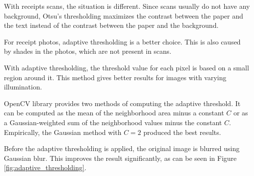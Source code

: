 \documentclass[
  digital, %
  table,   %
  oneside, %
  lof,     %
  lot,     %
]{fithesis3}
\begin{document}
\begin{enumerate}
    With receipts scans, the situation is different. Since scans usually do not have any background, Otsu's thresholding maximizes the contrast between the paper and the text instead of the contrast between the paper and the background.
    
    For receipt photos, adaptive thresholding is a better choice. This is also caused by shades in the photos, which are not present in scans.
    
    With adaptive thresholding, the threshold value for each pixel is based on a small region around it. This method gives better results for images with varying illumination. \cite{OpenCVThresholding}
    
    OpenCV library provides two methods of computing the adaptive threshold. It can be computed as the mean of the neighborhood area minus a constant $C$ or as a Gaussian-weighted sum of the neighborhood values minus the constant $C$. Empirically, the Gaussian method with $C = 2$ produced the best results.
    
    Before the adaptive thresholding is applied, the original image is blurred using Gaussian blur. This improves the result significantly, as can be seen in Figure \ref{fig:adaptive_thresholding}.
    

\end{enumerate}
\end{document}
